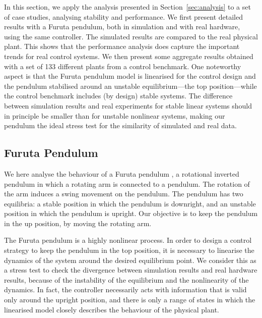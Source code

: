 In this section, we apply the analysis presented in Section~\ref{sec:analysis} to a set of case studies, analysing stability and performance. 
We first present detailed results with a Furuta pendulum, both in simulation and with real hardware, using the same controller. 
The simulated results are compared to the real physical plant. 
This shows that the performance analysis does capture the important trends for real control systems.
We then present some aggregate results obtained with a set of 133 different plants from a control benchmark.
One noteworthy aspect is that the Furuta pendulum model is linearised for the control design and the pendulum stabilised around an unstable equilibrium---the top position---while the control benchmark includes (by design) stable systems. 
The difference between simulation results and real experiments for stable linear systems should in principle be smaller than for unstable nonlinear systems, making our pendulum the ideal stress test for the similarity of simulated and real data.

\subsection{Furuta Pendulum}
\label{sec:example}

We here analyse the behaviour of a Furuta pendulum \cite{Furuta:1992}, a rotational inverted pendulum in which a rotating arm is connected to a pendulum. 
The rotation of the arm induces a swing movement on the pendulum. 
The pendulum has two equilibria: a stable position in which the pendulum is downright, and an unstable position in which the pendulum is upright. 
Our objective is to keep the pendulum in the up position, by moving the rotating arm.

The Furuta pendulum is a highly nonlinear process. 
In order to design a control strategy to keep the pendulum in the top position, it is necessary to linearise the dynamics of the system around the desired equilibrium point. 
We consider this as a stress test to check the divergence between simulation results and real hardware results, because of the instability of the equilibrium and the nonlinearity of the dynamics. 
In fact, the controller necessarily acts with information that is valid only around the upright position, and there is only a range of states in which the linearised model closely describes the behaviour of the physical plant.

